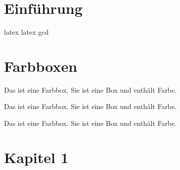 \documentclass[../main.tex]{subfiles}
\begin{document}

\section{Einführung}
\cite{sansom1958history}
\gls{latex}
\Gls{latex}
\acrshort{gcd}
\lipsum[1-2]

\newpage
\section{Farbboxen}
\begin{tcolorbox}[colback=orange!5!white,colframe=orange!75!black,title=\textbf{Farbboxe Orange}]
Das ist eine Farbbox. Sie ist eine Box und enthält Farbe.
\end{tcolorbox}

\begin{tcolorbox}[colback=red!5!white,colframe=red!75!black,title=\textbf{Farbboxe Rot}]
Das ist eine Farbbox. Sie ist eine Box und enthält Farbe.
\end{tcolorbox}

\begin{tcolorbox}[colback=blue!5!white,colframe=blue!75!black,title=\textbf{Farbboxe Blau}]
Das ist eine Farbbox. Sie ist eine Box und enthält Farbe.
\end{tcolorbox}


\newpage
\section{Kapitel 1}
\end{document}
